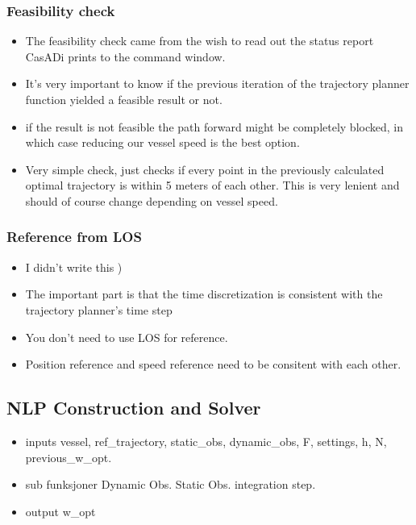 \subsubsection{Feasibility check}
\begin{itemize}
    \item The feasibility check came from the wish to read out the status report CasADi prints to the command window.
    \item It's very important to know if the previous iteration of the trajectory planner function yielded a feasible result or not.
    \item if the result is not feasible the path forward might be completely blocked, in which case reducing our vessel speed is the best option.
    \item Very simple check, just checks if every point in the previously calculated optimal trajectory is within 5 meters of each other. This is very lenient and should of course change depending on vessel speed.
\end{itemize}

\subsubsection{Reference from LOS}
\begin{itemize}
    \item I didn't write this \:)
    \item The important part is that the time discretization is consistent with the trajectory planner's time step
    \item You don't need to use LOS for reference.
    \item Position reference and speed reference need to be consitent with each other.
\end{itemize} 


\subsection{NLP Construction and Solver}
\begin{itemize}
    \item inputs\: vessel, ref\_trajectory, static\_obs, dynamic\_obs, F, settings, h, N, previous\_w\_opt.
    \item sub funksjoner\:
    \subitem Dynamic Obs.
    \subitem Static Obs.
    \subitem integration step.
    \item output\: w\_opt
\end{itemize}

